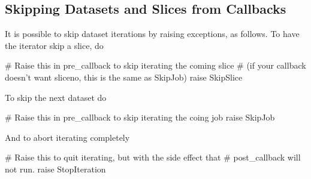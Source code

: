 \subsection*{Skipping Datasets and Slices from Callbacks}
It is possible to skip dataset iterations by raising exceptions, as
follows.  To have the iterator skip a slice, do
\begin{python}
# Raise this in pre_callback to skip iterating the coming slice
# (if your callback doesn't want sliceno, this is the same as SkipJob)
raise SkipSlice
\end{python}
To skip the next dataset do
\begin{python}
# Raise this in pre_callback to skip iterating the coing job
raise SkipJob
\end{python}
And to abort iterating completely
\begin{python}
# Raise this to quit iterating, but with the side effect that
# post_callback will not run.
raise StopIteration
\end{python}

